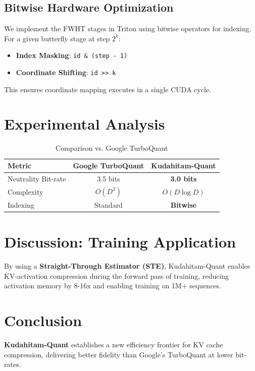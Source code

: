 \documentclass[twocolumn]{article}
\begin{document}
\subsection{Bitwise Hardware Optimization}
We implement the FWHT stages in Triton using bitwise operators for indexing. For a given butterfly stage at step $2^k$:
\begin{itemize}
    \item \textbf{Index Masking}: \texttt{id \& (step - 1)}
    \item \textbf{Coordinate Shifting}: \texttt{id >> k}
\end{itemize}
This ensures coordinate mapping executes in a single CUDA cycle.

\section{Experimental Analysis}
\begin{table}[h]
\centering
\caption{Comparison vs. Google TurboQuant}
\begin{tabular}{@{}lcc@{}}
\toprule
Metric & Google TurboQuant & \textbf{Kudahitam-Quant} \\ \midrule
Neutrality Bit-rate & 3.5 bits & \textbf{3.0 bits} \\
Complexity & $O(D^2)$ & \textbf{$O(D \log D)$} \\
Indexing & Standard & \textbf{Bitwise} \\ \bottomrule
\end{tabular}
\end{table}

\section{Discussion: Training Application}
By using a \textbf{Straight-Through Estimator (STE)}, Kudahitam-Quant enables KV-activation compression during the forward pass of training, reducing activation memory by 8-16x and enabling training on 1M+ sequences.

\section{Conclusion}
\textbf{Kudahitam-Quant} establishes a new efficiency frontier for KV cache compression, delivering better fidelity than Google's TurboQuant at lower bit-rates.
\end{document}
